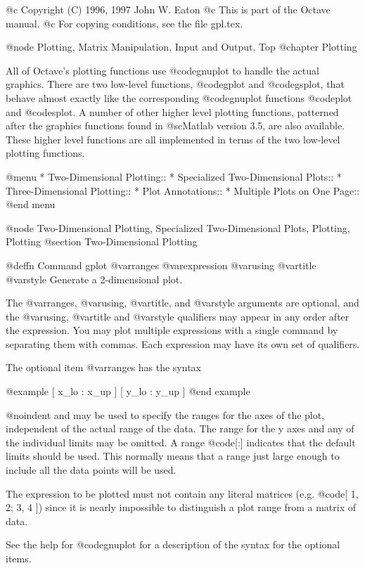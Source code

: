 @c Copyright (C) 1996, 1997 John W. Eaton
@c This is part of the Octave manual.
@c For copying conditions, see the file gpl.tex.

@node Plotting, Matrix Manipulation, Input and Output, Top
@chapter Plotting

All of Octave's plotting functions use @code{gnuplot} to handle the
actual graphics.  There are two low-level functions, @code{gplot} and
@code{gsplot}, that behave almost exactly like the corresponding
@code{gnuplot} functions @code{plot} and @code{splot}.  A number of
other higher level plotting functions, patterned after the graphics
functions found in @sc{Matlab} version 3.5, are also available.
These higher level functions are all implemented in terms of the two
low-level plotting functions.

@menu
* Two-Dimensional Plotting::    
* Specialized Two-Dimensional Plots::  
* Three-Dimensional Plotting::  
* Plot Annotations::            
* Multiple Plots on One Page::  
@end menu

@node Two-Dimensional Plotting, Specialized Two-Dimensional Plots, Plotting, Plotting
@section Two-Dimensional Plotting

@deffn {Command} gplot @var{ranges} @var{expression} @var{using} @var{title} @var{style}
Generate a 2-dimensional plot.

The @var{ranges}, @var{using}, @var{title}, and @var{style} arguments
are optional, and the @var{using}, @var{title} and @var{style}
qualifiers may appear in any order after the expression.  You may plot
multiple expressions with a single command by separating them with
commas.  Each expression may have its own set of qualifiers.

The optional item @var{ranges} has the syntax

@example
[ x_lo : x_up ] [ y_lo : y_up ]
@end example

@noindent
and may be used to specify the ranges for the axes of the plot,
independent of the actual range of the data.  The range for the y axes
and any of the individual limits may be omitted.  A range @code{[:]}
indicates that the default limits should be used.  This normally means
that a range just large enough to include all the data points will be
used.

The expression to be plotted must not contain any literal matrices
(e.g. @code{[ 1, 2; 3, 4 ]}) since it is nearly impossible to
distinguish a plot range from a matrix of data.

See the help for @code{gnuplot} for a description of the syntax for the
optional items.

